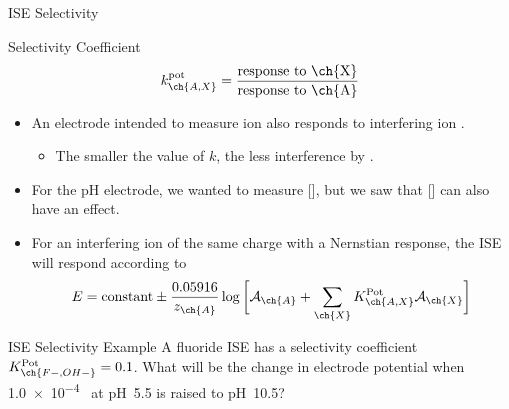 \documentclass[notes=only]{beamer}
\begin{document}
\begin{frame}{ISE Selectivity}
	\begin{block}{Selectivity Coefficient}
		\begin{equation*}
			k_{\ch{A,X}}^{\text{pot}} = \frac{\text{response to
			\ch{X}}}{\text{response to \ch{A}}}
		\end{equation*}
	\end{block}

	\begin{itemize}
		\item An electrode intended to measure ion  also responds
			to interfering ion .
			\begin{itemize}
				\item The smaller the value of $k$, the less
					interference by .
			\end{itemize}
		\item For the pH electrode, we wanted to measure [], but
			we saw that [] can also have an effect.
		\item For an interfering ion of the \alert{same charge} with a
			Nernstian response, the ISE will respond according to
			\begin{equation*}
				E = \text{constant} \pm
				\frac{0.05916}{z_{\ch{A}}} \log \bigg[
					\mathcal{A}_{\ch{A}} + \sum_{\ch{X}}
					K_{\ch{A,X}}^{\text{Pot}}
					\mathcal{A}_{\ch{X}} \bigg]
			\end{equation*}
	\end{itemize}
\end{frame}

\clearpage

\begin{frame}[t]{ISE Selectivity Example}
	A fluoride ISE has a selectivity coefficient
	$K_{\ch{F- , OH-}}^{\text{Pot}} = 0.1$. What will be the change in
	electrode potential when \SI{1.0e-4}{\Molar}~ at pH~5.5 is raised
	to pH~10.5?

	\vfill

\end{frame}
\end{document}
